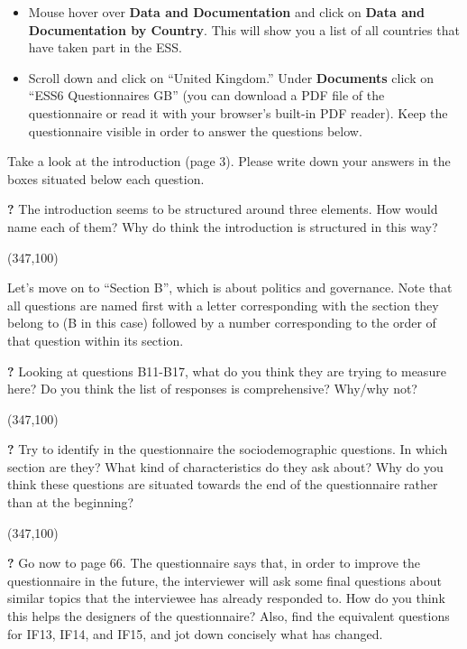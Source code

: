 \begin{itemize}
	\item Mouse hover over \textbf{Data and Documentation} and click on \textbf{Data and Documentation by Country}. This will show you a list of all countries that have taken part in the ESS.
	\item Scroll down and click on ``United Kingdom.'' Under \textbf{Documents} click on ``ESS6 Questionnaires GB'' (you can download a PDF file of the questionnaire or read it with your browser's built-in PDF reader). Keep the questionnaire visible in order to answer the questions below.
\end{itemize}

Take a look at the introduction (page 3). Please write down your answers in the boxes situated below each question.

\pagebreak

\forceindent \textbf{?} The introduction seems to be structured around three elements. How would name each of them? Why do think the introduction is structured in this way?

\framebox(347,100){}

Let's move on to ``Section B'', which is about politics and governance. Note that all questions are named first with a letter corresponding with the section they belong to (B in this case) followed by a number corresponding to the order of that question within its section.

\forceindent \textbf{?} Looking at questions B11-B17, what do you think they are trying to measure here? Do you think the list of responses is comprehensive? Why/why not?

\framebox(347,100){}

\forceindent \textbf{?} Try to identify in the questionnaire the sociodemographic questions. In which section are they? What kind of characteristics do they ask about? Why do you think these questions are situated towards the end of the questionnaire rather than at the beginning?

\framebox(347,100){}

\pagebreak

\forceindent \textbf{?} Go now to page 66. The questionnaire says that, in order to improve the questionnaire in the future, the interviewer will ask some final questions about similar topics that the interviewee has already responded to. How do you think this helps the designers of the questionnaire? Also, find the equivalent questions for IF13, IF14, and IF15, and jot down concisely what has changed.

